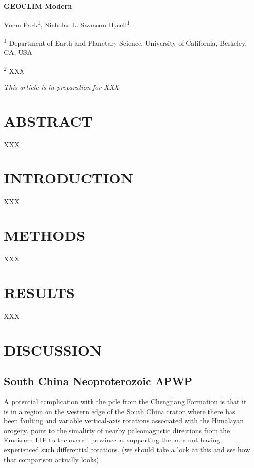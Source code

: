 \documentclass[11pt,letterpaper]{article}
\begin{document}
\begin{flushleft}
{\Large \textbf{GEOCLIM Modern}}

Yuem Park\textsuperscript{1},
Nicholas L. Swanson-Hysell\textsuperscript{1}

\bigskip
\textsuperscript{1} Department of Earth and Planetary Science, University of California, Berkeley, CA, USA

\textsuperscript{2} XXX
\bigskip

\end{flushleft}

\noindent\textit{This article is in preparation for XXX}

\linenumbers

\section*{ABSTRACT \label{sec:ABSTRACT}}

XXX

\section*{INTRODUCTION \label{sec:INTRODUCTION}}

XXX

\section*{METHODS}

XXX

\section*{RESULTS}

XXX

\section*{DISCUSSION}

\subsection*{South China Neoproterozoic APWP}

A potential complication with the pole from the Chengjiang Formation is that it is in a region on the western edge of the South China craton where there has been faulting and variable vertical-axis rotations associated with the Himalayan orogeny. \cite{Jing2019} point to the simalirty of nearby paleomagnetic directions from the Emeishan LIP to the overall province as supporting the area not having experienced such differential rotations. (we should take a look at this and see how that comparison actually looks)
\end{document}
